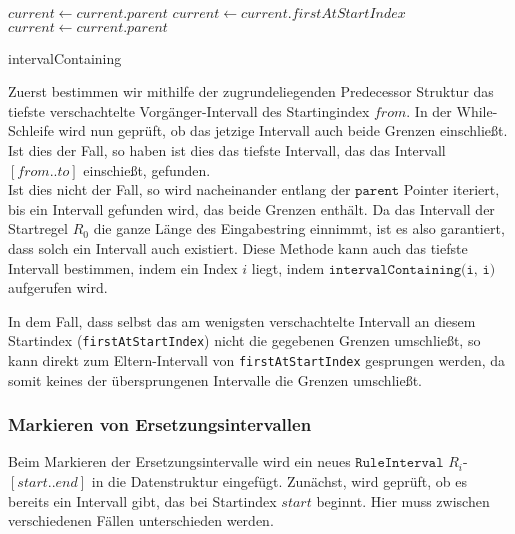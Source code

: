\begin{algorithm}
     {
         {
        }
         {
            $current \leftarrow current.parent$\;
        }{
            $current \leftarrow current.firstAtStartIndex$\;
             {
                $current \leftarrow current.parent$ \;
            }
        }
    }
    \caption{intervalContaining}
\end{algorithm}

Zuerst bestimmen wir mithilfe der zugrundeliegenden Predecessor Struktur das tiefste verschachtelte Vorgänger-Intervall des Startingindex $from$. 
In der While-Schleife wird nun geprüft, ob das jetzige Intervall auch beide Grenzen einschließt. Ist dies der Fall, so haben ist dies das tiefste Intervall, das das Intervall $[from..to]$ einschießt, gefunden.\\
Ist dies nicht der Fall, so wird nacheinander entlang der $\texttt{parent}$ Pointer iteriert, bis ein Intervall gefunden wird, das beide Grenzen enthält. Da das Intervall der Startregel $R_0$ die ganze Länge des Eingabestring einnimmt, ist es also garantiert, dass solch ein Intervall auch existiert. Diese Methode kann auch das tiefste Intervall bestimmen, indem ein Index $i$ liegt, indem $\texttt{intervalContaining(i, i)}$ aufgerufen wird.

In dem Fall, dass selbst das am wenigsten verschachtelte Intervall an diesem Startindex (\texttt{firstAtStartIndex}) nicht die gegebenen Grenzen umschließt, so kann direkt zum Eltern-Intervall von \texttt{firstAtStartIndex} gesprungen werden, da somit keines der übersprungenen Intervalle die Grenzen umschließt. 

\subsubsection{Markieren von Ersetzungsintervallen}

Beim Markieren der Ersetzungsintervalle wird ein neues $\texttt{RuleInterval}$ $R_i$-$[start..end]$ in die Datenstruktur eingefügt. 
Zunächst, wird geprüft, ob es bereits ein Intervall gibt, das bei Startindex $start$ beginnt.
Hier muss zwischen verschiedenen Fällen unterschieden werden.

